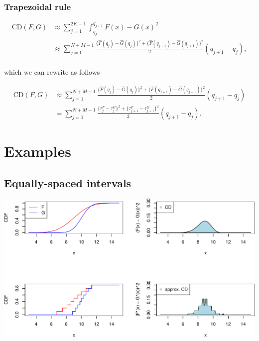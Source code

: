 \documentclass[
]{article}
\begin{document}
\hypertarget{trapezoidal-rule-1}{%
\subsubsection{Trapezoidal rule}\label{trapezoidal-rule-1}}

\begin{align}
\text{CD}(F,G) &\approx\sum^{2K-1}_{j=1}\int^{q_{j+1}}_{q_j}{F(x)−G(x)}^2\\
&\approx\sum^{N+M-1}_{j=1}\frac{\{\hat{F}(q_j)-\hat{G}(q_j)\}^2+\{\hat{F}(q_{j+1})-\hat{G}(q_{j+1})\}^2}{2}(q_{j+1}-q_{j}),\\
\end{align}

which we can rewrite as follows

\begin{align}
\text{CD}(F,G) 
&\approx\sum^{N+M-1}_{j=1}\frac{\{\hat{F}(q_j)-\hat{G}(q_j)\}^2+\{\hat{F}(q_{j+1})-\hat{G}(q_{j+1})\}^2}{2}(q_{j+1}-q_{j})\\
&=
\sum^{N+M-1}_{j=1}\frac{\{\tau^F_j-\tau^G_j\}^2+\{\tau^F_{j+1}-\tau^G_{j+1}\}^2}{2}(q_{j+1}-q_{j}).
\end{align}

\hypertarget{examples}{%
\section{Examples}\label{examples}}

\hypertarget{equally-spaced-intervals}{%
\subsection{Equally-spaced intervals}\label{equally-spaced-intervals}}

\includegraphics{cd_approx_2_files/figure-latex/unnamed-chunk-2-1.pdf}
\end{document}
